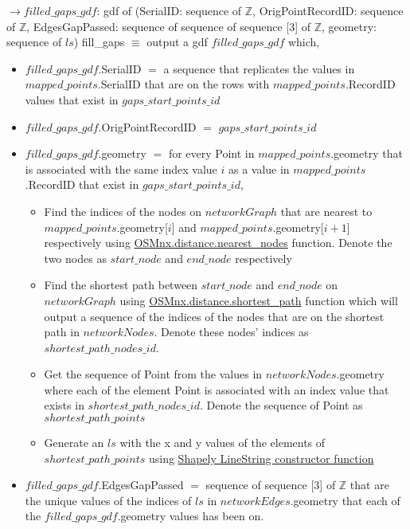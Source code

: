 \documentclass[12pt, titlepage]{article}
\begin{document}
\newline$\rightarrow$\newline $filled\_gaps\_gdf$: gdf of (SerialID: sequence of $\mathbb{Z}$, OrigPointRecordID: sequence of $\mathbb{Z}$, EdgesGapPassed: sequence of sequence of sequence [3] of $\mathbb{Z}$, geometry: sequence of $ls$)\newline
fill\_gaps $\equiv$ output a gdf $filled\_gaps\_gdf$ which,\newline
\begin{itemize}
    \item $filled\_gaps\_gdf$.SerialID $=$ a sequence that replicates the values in $mapped\_points$.SerialID that are on the rows with $mapped\_points$.RecordID values that exist in $gaps\_start\_points\_id$
    \item $filled\_gaps\_gdf$.OrigPointRecordID $=$ $gaps\_start\_points\_id$
    \item $filled\_gaps\_gdf$.geometry $=$ for every Point in $mapped\_points$.geometry that is associated with the same index value $i$ as a value in $mapped\_points$.RecordID that exist in $gaps\_start\_points\_id$,
    \begin{itemize}
        \item Find the indices of the nodes on $networkGraph$ that are nearest to $mapped\_points$.geometry[$i$] and $mapped\_points$.geometry[$i+1$] respectively using \href{https://osmnx.readthedocs.io/en/stable/osmnx.html#osmnx.distance.nearest_nodes}{OSMnx.distance.nearest\_nodes} function. Denote the two nodes as $start\_node$ and $end\_node$ respectively
        \item Find the shortest path between $start\_node$ and $end\_node$ on $networkGraph$ using \href{https://osmnx.readthedocs.io/en/stable/osmnx.html#osmnx.distance.shortest_path}{OSMnx.distance.shortest\_path} function which will output a sequence of the indices of the nodes that are on the shortest path in $networkNodes$. Denote these nodes' indices as $shortest\_path\_nodes\_id$.
        \item Get the sequence of Point from the values in $networkNodes$.geometry where each of the element Point is associated with an index value that exists in $shortest\_path\_nodes\_id$. Denote the sequence of Point as $shortest\_path\_points$
        \item Generate an $ls$ with the x and y values of the elements of $shortest\_path\_points$ using \href{https://shapely.readthedocs.io/en/stable/manual.html#LineString}{Shapely LineString constructor function}
    \end{itemize}
    \item $filled\_gaps\_gdf$.EdgesGapPassed $=$ sequence of sequence [3] of $\mathbb{Z}$ that are the unique values of the indices of $ls$ in $networkEdges$.geometry that each of the $filled\_gaps\_gdf$.geometry values has been on.
\end{itemize}
\end{document}
